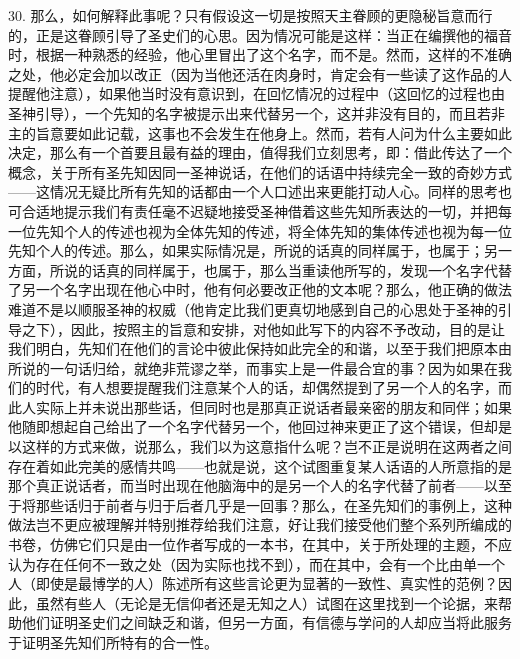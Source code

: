 30. 那么，如何解释此事呢？只有假设这一切是按照天主眷顾的更隐秘旨意而行的，正是这眷顾引导了圣史们的心思。因为情况可能是这样：当正在编撰他的福音时，根据一种熟悉的经验，他心里冒出了这个名字，而不是。然而，这样的不准确之处，他必定会加以改正（因为当他还活在肉身时，肯定会有一些读了这作品的人提醒他注意），如果他当时没有意识到，在回忆情况的过程中（这回忆的过程也由圣神引导），一个先知的名字被提示出来代替另一个，这并非没有目的，而且若非主的旨意要如此记载，这事也不会发生在他身上。然而，若有人问为什么主要如此决定，那么有一个首要且最有益的理由，值得我们立刻思考，即：借此传达了一个概念，关于所有圣先知因同一圣神说话，在他们的话语中持续完全一致的奇妙方式——这情况无疑比所有先知的话都由一个人口述出来更能打动人心。同样的思考也可合适地提示我们有责任毫不迟疑地接受圣神借着这些先知所表达的一切，并把每一位先知个人的传述也视为全体先知的传述，将全体先知的集体传述也视为每一位先知个人的传述。那么，如果实际情况是，所说的话真的同样属于，也属于；另一方面，所说的话真的同样属于，也属于，那么当重读他所写的，发现一个名字代替了另一个名字出现在他心中时，他有何必要改正他的文本呢？那么，他正确的做法难道不是以顺服圣神的权威（他肯定比我们更真切地感到自己的心思处于圣神的引导之下），因此，按照主的旨意和安排，对他如此写下的内容不予改动，目的是让我们明白，先知们在他们的言论中彼此保持如此完全的和谐，以至于我们把原本由所说的一句话归给，就绝非荒谬之举，而事实上是一件最合宜的事？因为如果在我们的时代，有人想要提醒我们注意某个人的话，却偶然提到了另一个人的名字，而此人实际上并未说出那些话，但同时也是那真正说话者最亲密的朋友和同伴；如果他随即想起自己给出了一个名字代替另一个，他回过神来更正了这个错误，但却是以这样的方式来做，说那么，我们以为这意指什么呢？岂不正是说明在这两者之间存在着如此完美的感情共鸣——也就是说，这个试图重复某人话语的人所意指的是那个真正说话者，而当时出现在他脑海中的是另一个人的名字代替了前者——以至于将那些话归于前者与归于后者几乎是一回事？那么，在圣先知们的事例上，这种做法岂不更应被理解并特别推荐给我们注意，好让我们接受他们整个系列所编成的书卷，仿佛它们只是由一位作者写成的一本书，在其中，关于所处理的主题，不应认为存在任何不一致之处（因为实际也找不到），而在其中，会有一个比由单一个人（即使是最博学的人）陈述所有这些言论更为显著的一致性、真实性的范例？因此，虽然有些人（无论是无信仰者还是无知之人）试图在这里找到一个论据，来帮助他们证明圣史们之间缺乏和谐，但另一方面，有信德与学问的人却应当将此服务于证明圣先知们所特有的合一性。\par

